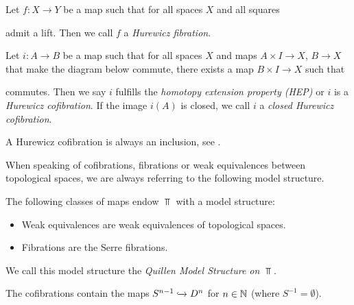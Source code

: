 \begin{definition}
    Let $f\colon X\to Y$ be a map such that for all spaces $X$ and all squares
    \begin{center}
    \end{center}
    admit a lift.
    Then we call $f$ a \emph{Hurewicz fibration}.
\end{definition}
\begin{definition}
    Let $i\colon A\to B$ be a map such that for all spaces $X$ and maps $A\times I\to X$, $B\to X$ that make the diagram below commute, there exists a map $B\times I\to X$ such that
    \begin{center}
    \end{center}
    commutes.
    Then we say $i$ fulfills the \emph{homotopy extension property (HEP)} or $i$ is a \emph{Hurewicz cofibration}.
    If the image $i(A)$ is closed, we call $i$ a \emph{closed Hurewicz cofibration}.
\end{definition}
\begin{remark}
    A Hurewicz cofibration is always an inclusion, see \cite[Proposition 4H.1]{hatcher2002algebraic}.
\end{remark}
When speaking of cofibrations, fibrations or weak equivalences between topological spaces, we are always referring to the following model structure.
\begin{prop}
    The following classes of maps endow $\Top$ with a model structure:
    \begin{itemize}
        \item Weak equivalences are weak equivalences of topological spaces. %
        \item Fibrations are the Serre fibrations.
    \end{itemize}
    We call this model structure the \emph{Quillen Model Structure on $\Top$}.
    
    The cofibrations contain the maps $S^{n-1}\xhookrightarrow{}D^n$ for $n\in\mathbb{N}$ (where $S^{-1}=\emptyset$).
    \begin{reference}
        \cite[Chap. II, \S 3, Theorem 1]{Quillen1967}
    \end{reference}
\end{prop}
